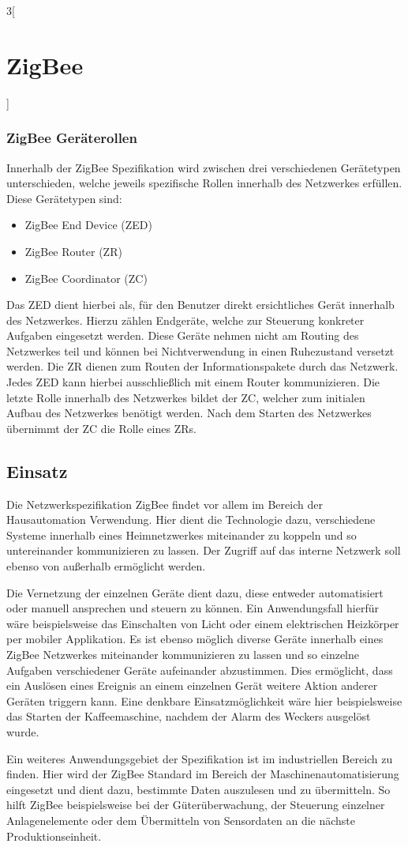 \begin{multicols}{3}[\section{ZigBee}]
\subsubsection*{ZigBee Geräterollen}
Innerhalb der ZigBee Spezifikation wird zwischen drei verschiedenen Gerätetypen unterschieden, welche jeweils spezifische Rollen innerhalb des Netzwerkes erfüllen. Diese Gerätetypen sind: 
\begin{itemize}
	\item ZigBee End Device (ZED)
	\item ZigBee Router (ZR)
	\item ZigBee Coordinator (ZC)
\end{itemize}
Das ZED dient hierbei als, für den Benutzer direkt ersichtliches Gerät innerhalb des Netzwerkes. Hierzu zählen Endgeräte, welche zur Steuerung konkreter Aufgaben eingesetzt werden. Diese Geräte nehmen nicht am Routing des Netzwerkes teil und können bei Nichtverwendung in einen Ruhezustand versetzt werden. Die ZR dienen zum Routen der Informationspakete durch das Netzwerk. Jedes ZED kann hierbei ausschließlich mit einem Router kommunizieren. Die letzte Rolle innerhalb des Netzwerkes bildet der ZC, welcher zum initialen Aufbau des Netzwerkes benötigt werden. Nach dem Starten des Netzwerkes übernimmt der ZC die Rolle eines ZRs.~\cite{zigbee.10}

\subsection*{Einsatz}
Die Netzwerkspezifikation ZigBee findet vor allem im Bereich der Hausautomation Verwendung. Hier dient die Technologie dazu, verschiedene Systeme innerhalb eines Heimnetzwerkes miteinander zu koppeln und so untereinander kommunizieren zu lassen. Der Zugriff auf das interne Netzwerk soll ebenso von außerhalb ermöglicht werden. 
\par Die Vernetzung der einzelnen Geräte dient dazu, diese entweder automatisiert oder manuell ansprechen und steuern zu können. Ein Anwendungsfall hierfür wäre beispielsweise das Einschalten von Licht oder einem elektrischen Heizkörper per mobiler Applikation. Es ist ebenso möglich diverse Geräte innerhalb eines ZigBee Netzwerkes miteinander kommunizieren zu lassen und so einzelne Aufgaben verschiedener Geräte aufeinander abzustimmen. Dies ermöglicht, dass ein Auslösen eines Ereignis an einem einzelnen Gerät weitere Aktion anderer Geräten triggern kann. Eine denkbare Einsatzmöglichkeit wäre hier beispielsweise das Starten der Kaffeemaschine, nachdem der Alarm des Weckers ausgelöst wurde.  
\par Ein weiteres Anwendungsgebiet der Spezifikation ist im industriellen Bereich zu finden. Hier wird der ZigBee Standard im Bereich der Maschinenautomatisierung eingesetzt und dient dazu, bestimmte Daten auszulesen und zu übermitteln. So hilft ZigBee beispielsweise bei der Güterüberwachung, der Steuerung einzelner Anlagenelemente oder dem Übermitteln von Sensordaten an die nächste Produktionseinheit.~\cite{zigbee.10}


\end{multicols}
